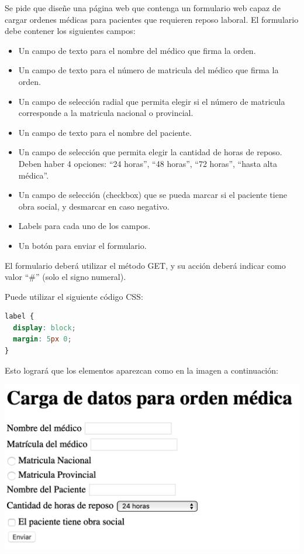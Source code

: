 \begin{exercise}
Se pide que diseñe una página web que contenga un formulario web capaz de
cargar ordenes médicas para pacientes que requieren reposo laboral. El
formulario debe contener los siguientes campos:
\begin{itemize}
  \item Un campo de texto para el nombre del médico que firma la orden.
  \item Un campo de texto para el número de matricula del médico que firma la orden.
  \item Un campo de selección radial que permita elegir si el número de
    matricula corresponde a la matricula nacional o provincial.
  \item Un campo de texto para el nombre del paciente.
  \item Un campo de selección que permita elegir la cantidad de horas de reposo.
    Deben haber 4 opciones: ``24 horas'', ``48 horas'', ``72 horas'', ``hasta alta médica''.
  \item Un campo de selección (checkbox) que se pueda marcar si el paciente
    tiene obra social, y desmarcar en caso negativo.
  \item Labels para cada uno de los campos.
  \item Un botón para enviar el formulario.
\end{itemize}
El formulario deberá utilizar el método GET, y su acción deberá indicar como
valor ``\#'' (solo el signo numeral).

Puede utilizar el siguiente código CSS:
\begin{adjustwidth}{25pt}{10pt}
  \begin{lstlisting}[language=CSS]
label {
  display: block;
  margin: 5px 0;
}
  \end{lstlisting}
\end{adjustwidth}
Esto logrará que los elementos aparezcan como en la imagen a continuación:

\includegraphics[scale=0.65]{anexos/1_lenguajes_marcado/2_html/imagenes/formulario_1.png}
\end{exercise}

